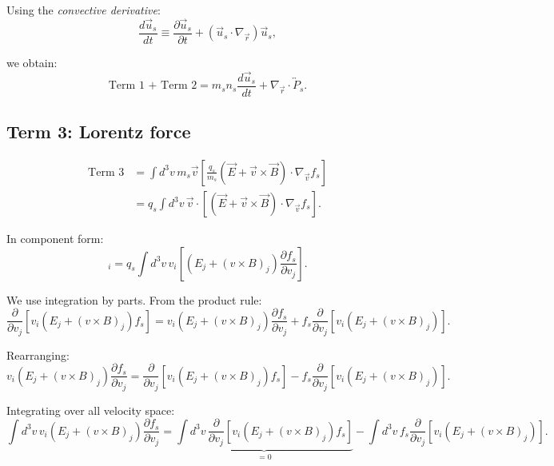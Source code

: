 Using the \emph{convective derivative}:
\begin{equation*}
\frac{d\vec{u}_s}{dt} \equiv \frac{\partial \vec{u}_s}{\partial t} + (\vec{u}_s \cdot \nabla_{\vec{r}}) \vec{u}_s,
\end{equation*}

we obtain:
\begin{equation*}
 \text{Term 1 + Term 2} = m_s n_s \frac{d\vec{u}_s}{dt} + \nabla_{\vec{r}} \cdot \overleftrightarrow{P}_s.
\end{equation*}

\subsection*{Term 3: Lorentz force}

\begin{align*}
\text{Term 3} &= \int d^3v \, m_s \vec{v} \left[ \frac{q_s}{m_s}(\vec{E} + \vec{v} \times \vec{B}) \cdot \nabla_{\vec{v}} f_s \right]  \\
&= q_s \int d^3v \, \vec{v} \cdot [(\vec{E} + \vec{v} \times \vec{B}) \cdot \nabla_{\vec{v}} f_s].
\end{align*}

In component form:
\begin{equation*}
[\text{Term 3}]_i = q_s \int d^3v \, v_i [(E_j + (v \times B)_j) \frac{\partial f_s}{\partial v_j}].
\end{equation*}

We use integration by parts. From the product rule:
\begin{equation*}
\frac{\partial}{\partial v_j} [v_i (E_j + (v \times B)_j) f_s] = v_i (E_j + (v \times B)_j) \frac{\partial f_s}{\partial v_j} + f_s \frac{\partial}{\partial v_j}[v_i (E_j + (v \times B)_j)].
\end{equation*}

Rearranging:
\begin{equation*}
v_i (E_j + (v \times B)_j) \frac{\partial f_s}{\partial v_j} = \frac{\partial}{\partial v_j} [v_i (E_j + (v \times B)_j) f_s] - f_s \frac{\partial}{\partial v_j}[v_i (E_j + (v \times B)_j)].
\end{equation*}

Integrating over all velocity space:
\begin{equation*}
\int d^3v \, v_i (E_j + (v \times B)_j) \frac{\partial f_s}{\partial v_j} = \underbrace{\int d^3v \, \frac{\partial}{\partial v_j} [v_i (E_j + (v \times B)_j) f_s]}_{=0} - \int d^3v \, f_s \frac{\partial}{\partial v_j}[v_i (E_j + (v \times B)_j)].
\end{equation*}

